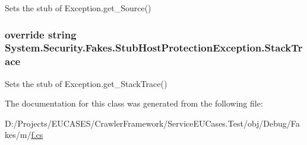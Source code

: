 Sets the stub of Exception.\-get\-\_\-\-Source()

\hypertarget{class_system_1_1_security_1_1_fakes_1_1_stub_host_protection_exception_a28a3b48b18d39c5eb5a4a3e6bd64f8c3}{
\subsubsection[{Stack\-Trace}]{\setlength{\rightskip}{0pt plus 5cm}override string System.\-Security.\-Fakes.\-Stub\-Host\-Protection\-Exception.\-Stack\-Trace\hspace{0.3cm}{\ttfamily [get]}}}\label{class_system_1_1_security_1_1_fakes_1_1_stub_host_protection_exception_a28a3b48b18d39c5eb5a4a3e6bd64f8c3}


Sets the stub of Exception.\-get\-\_\-\-Stack\-Trace()



The documentation for this class was generated from the following file\-:\begin{DoxyCompactItemize}
\item 
D\-:/\-Projects/\-E\-U\-C\-A\-S\-E\-S/\-Crawler\-Framework/\-Service\-E\-U\-Cases.\-Test/obj/\-Debug/\-Fakes/m/\hyperlink{m_2f_8cs}{f.\-cs}\end{DoxyCompactItemize}
